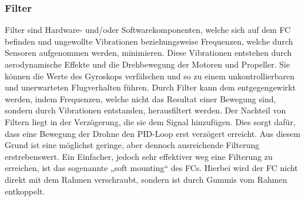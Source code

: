         \subsubsection[Filter]{Filter}
        Filter sind Hardware- und/oder Softwarekomponenten, welche sich auf dem FC befinden und
        ungewollte Vibrationen beziehungsweise Frequenzen, welche durch Sensoren aufgenommen werden,
        minimieren. Diese Vibrationen entstehen durch aerodynamische Effekte und die Drehbewegung
        der Motoren und Propeller. Sie können die Werte des Gyroskops verfälschen und so zu einem
        unkontrollierbaren und unerwarteten Flugverhalten führen. Durch Filter kann dem entgegengewirkt
        werden, indem Frequenzen, welche nicht das Resultat einer Bewegung sind, sondern durch Vibrationen
        entstanden, herausfiltert werden. Der Nachteil von Filtern liegt in der Verzögerung, die sie
        dem Signal hinzufügen. Dies sorgt dafür, dass eine Bewegung der Drohne den PID-Loop erst verzögert
        erreicht. Aus diesem Grund ist eine möglichst geringe, aber dennoch ausreichende Filterung
        erstrebenswert. Ein Einfacher, jedoch sehr effektiver weg eine Filterung zu erreichen, ist das
        sogenannte „soft mounting“ des FCs. Hierbei wird der FC nicht direkt mit dem Rahmen verschraubt,
        sondern ist durch Gummis vom Rahmen entkoppelt.
         
